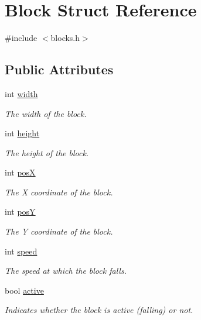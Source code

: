 \hypertarget{structBlock}{}\section{Block Struct Reference}
\label{structBlock}


{\ttfamily \#include $<$blocks.\+h$>$}

\subsection*{Public Attributes}
\begin{DoxyCompactItemize}
\item 
int \mbox{\hyperlink{structBlock_a867e5f837601e459d9831e3cfb4f4738}{width}}
\begin{DoxyCompactList}\small\item\em The width of the block. \end{DoxyCompactList}\item 
int \mbox{\hyperlink{structBlock_a48784377c41dfd4fd323ea238bec42fe}{height}}
\begin{DoxyCompactList}\small\item\em The height of the block. \end{DoxyCompactList}\item 
int \mbox{\hyperlink{structBlock_ad1db677097e72dd66e59a29f0bbce569}{posX}}
\begin{DoxyCompactList}\small\item\em The X coordinate of the block. \end{DoxyCompactList}\item 
int \mbox{\hyperlink{structBlock_a675610bc12401b8d5f494ddae9998916}{posY}}
\begin{DoxyCompactList}\small\item\em The Y coordinate of the block. \end{DoxyCompactList}\item 
int \mbox{\hyperlink{structBlock_a2d831bc3c75fd862c47c40200e05c662}{speed}}
\begin{DoxyCompactList}\small\item\em The speed at which the block falls. \end{DoxyCompactList}\item 
bool \mbox{\hyperlink{structBlock_a6305c38cf8aaf8df64d97b7bc177b067}{active}}
\begin{DoxyCompactList}\small\item\em Indicates whether the block is active (falling) or not. \end{DoxyCompactList}\end{DoxyCompactItemize}


